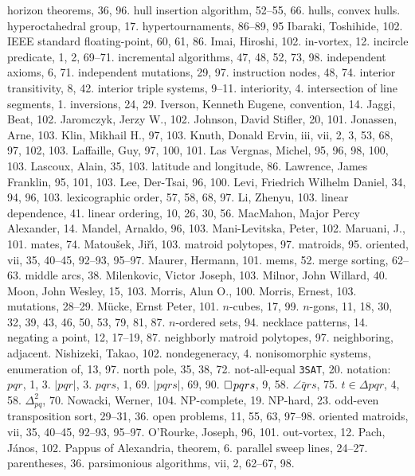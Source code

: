 horizon theorems, 36, 96.
hull insertion algorithm, 52--55, 66.
hulls, \see convex hulls.
hyperoctahedral group, 17.
hypertournaments, 86--89, 95
\medskip
Ibaraki, Toshihide, 102.
IEEE standard floating-point, 60, 61, 86.
Imai, Hiroshi, 102.
in-vortex, 12.
incircle predicate, 1, 2, 69--71.
incremental algorithms, 47, 48, 52, 73, 98.
independent axioms, 6, 71.
independent mutations, 29, 97.
instruction nodes, 48, 74.
interior transitivity, 8, 42.
interior triple systems, 9--11.
interiority, 4.
intersection of line segments, 1.
inversions, 24, 29.
Iverson, Kenneth Eugene, convention, 14.
\medskip
Jaggi, Beat, 102.
Jaromczyk, Jerzy W., 102.
Johnson, David Stifler, 20, 101.
Jonassen, Arne, 103.
\medskip
Klin, Mikhail H., 97, 103.
Knuth, Donald Ervin, iii, vii, 2, 3, 53, 68, 97, 102, 103.
\medskip
Laffaille, Guy, 97, 100, 101.
Las Vergnas, Michel, 95, 96, 98, 100, 103.
Lascoux, Alain, 35, 103.
latitude and longitude, 86.
Lawrence, James Franklin, 95, 101, 103.
Lee, Der-Tsai, 96, 100.
Levi, Friedrich Wilhelm Daniel, 34, 94, 96, 103.
lexicographic order, 57, 58, 68, 97.
Li, Zhenyu, 103.
linear dependence, 41.
linear ordering, 10, 26, 30, 56.
\medskip
MacMahon, Major Percy Alexander, 14.
Mandel, Arnaldo, 96, 103.
Mani-Levitska, Peter, 102.
Maruani, J., 101.
mates, 74.
Matou\v{s}ek, Ji\v{r}\'\i, 103.
matroid polytopes, 97.
matroids, 95.
\sub oriented, vii, 35, 40--45, 92--93, 95--97.
Maurer, Hermann, 101.
mems, 52.
merge sorting, 62--63.
middle arcs, 38.
Milenkovic, Victor Joseph, 103.
Milnor, John Willard, 40.
Moon, John Wesley, 15, 103.
Morris, Alun O., 100.
Morris, Ernest, 103.
mutations, 28--29.
M\"ucke, Ernst Peter, 101.
\medskip
$n$-cubes, 17, 99.
$n$-gons, 11, 18, 30, 32, 39, 43, 46, 50, 53, 79, 81, 87.
$n$-ordered sets, 94.
necklace patterns, 14.
negating a point, 12, 17--19, 87.
neighborly matroid polytopes, 97.
neighboring, \see adjacent.
Nishizeki, Takao, 102.
nondegeneracy, 4.
nonisomorphic systems, enumeration of, 13, 97.
north pole, 35, 38, 72.
not-all-equal {\tt 3SAT}, 20.
notation: $pqr$, 1, 3.
\sub $\vert pqr\vert$, 3.
\sub $pqrs$, 1, 69.
\sub $\vert pqrs\vert$, 69, 90.
\sub $\sqbox pqrs$, 9, 58.
\sub $\angle\bar qrs$, 75.
\sub $t\in \Delta pqr$, 4, 58.
\sub $\Delta^2_{pq}$, 70.
Nowacki, Werner, 104.
NP-complete, 19.
NP-hard, 23.
\medskip
odd-even transposition sort, 29--31, 36.
open problems, 11, 55, 63, 97--98.
oriented matroids, vii, 35, 40--45, 92--93, 95--97.
O'Rourke, Joseph, 96, 101.
out-vortex, 12.
\medskip
Pach, J\'anos, 102.
Pappus of Alexandria, theorem, 6.
parallel sweep lines, 24--27.
parentheses, 36.
parsimonious algorithms, vii, 2, 62--67, 98.
